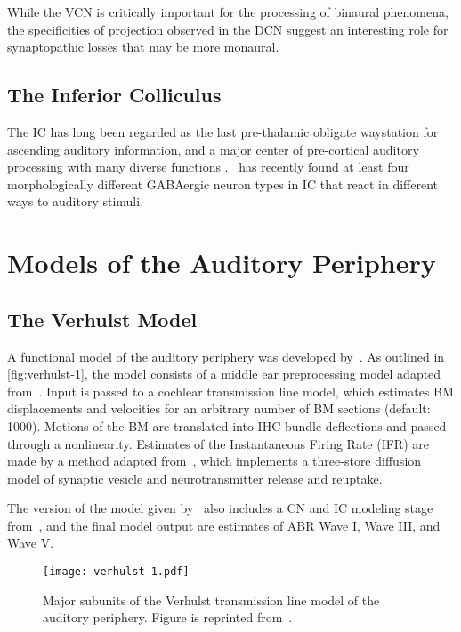 While the VCN is critically important for the processing of binaural phenomena, the specificities of projection observed in the DCN suggest an interesting role for synaptopathic losses that may be more monaural.
\subsection{The Inferior Colliculus} %
\label{sub:the_inferior_colliculus}
The IC has long been regarded as the last pre-thalamic obligate waystation for ascending auditory information, and a major center of pre-cortical auditory processing with many diverse functions \citep{Cant2005Atlas,Covey2008Inputs,Moore1985Projections}.~\cite{Beebe2016Extracellular} has recently found at least four morphologically different GABAergic neuron types in IC that react in different ways to auditory stimuli.

\section{Models of the Auditory Periphery} %
\label{sec:models_of_the_auditory_periphery}
\subsection{The Verhulst Model} %
\label{sub:the_verhulst_model}
A functional model of the auditory periphery was developed by~\cite{Verhulst2015Functional}.  As outlined in \autoref{fig:verhulst-1}, the model consists of a middle ear preprocessing model adapted from~\cite{Meddis2010Computational}.  Input is passed to a cochlear transmission line model, which estimates BM displacements and velocities for an arbitrary number of BM sections (default: 1000).  Motions of the BM are translated into IHC bundle deflections and passed through a nonlinearity.  Estimates of the Instantaneous Firing Rate (IFR) are made by a method adapted from~\cite{Westerman1988Diffusion}, which implements a three-store diffusion model of synaptic vesicle and neurotransmitter release and reuptake.  

The version of the model given by~\cite{Verhulst2015Functional} also includes a CN and IC modeling stage from~\cite{Nelson2004Phenomenological}, and the final model output are estimates of ABR Wave I, Wave III, and Wave V. 

\begin{figure}[htbp]
	\centering
	\texttt{[image: verhulst-1.pdf]}
	\caption[The Verhulst Model]{Major subunits of the Verhulst transmission line model of the auditory periphery.  Figure is reprinted from~\cite{Verhulst2015Functional}.}
	\label{fig:verhulst-1}
\end{figure}


